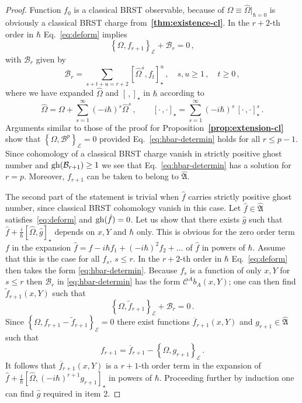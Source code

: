 \documentclass[a4paper,11pt]{amsart}
\numberwithin{thm}{section} %
\numberwithin{equation}{section} %
\numberwithin{figure}{section} %
\newcommand{\bref}[1]{{\bf \ref{#1}}}
\def\ih{-i\hbar}
\newcommand{\qcommut}[2]{[#1,#2]_\star}
\newcommand{\pb}[2]{\left\{{}#1{},{}#2{}\right\}}
\newcommand{\gh}[1]{{\rm gh}(#1)}
\renewcommand{\:}{{\rm\, :\,}}
\def\bar{\overline}
\def\cc{{\mathcal C}}
\def\cB{{\mathcal B}}
\def\qA{{\hat{\mathfrak A}}}
\def\E{{ \mathcal E}}
\begin{document}
\begin{proof}
Function $f_0$ is a classical BRST observable, because of
$\Omega\equiv{\hat\Omega}\bigr|_{\hbar=0}$ is obviously a classical
BRST charge from~\bref{thm:existence-cl}.  In the $r+2$-th order in
$\hbar$ Eq.~\eqref{eq:deform} implies
\begin{equation}
\label{eq:hbar-determin}
  \pb{\Omega}{f_{r+1}}_\E+\cB_r=0\,,
\end{equation}
with $\cB_r$ given by
\begin{equation}
\cB_r=\sum_{s+t+u=r+2} \qcommut{{\hat\Omega}^s}{f_t}^u\,, \quad s,u\geq
1\,, \quad t\geq 0\,,
\end{equation}
where we have expanded ${\hat\Omega}$ and $\qcommut{\,}{}$ in $\hbar$
according to
\begin{equation}
{\hat\Omega}=\Omega+\sum^\infty_{s=1}(\ih)^s {\hat\Omega}^s\,,\qquad
\qcommut{\cdot\,}{\cdot}=\sum^\infty_{s=1}(\ih)^s \,
\qcommut{\cdot\,}{\cdot}^s\,.
\end{equation}
Arguments similar to those of the proof for
Proposition~\bref{prop:extension-cl} show that
$\pb{\Omega}{\cB^p}_\E=0$ provided Eq.~\eqref{eq:hbar-determin} holds
for all $r\leq p-1$. Since cohomology of a classical BRST charge
vanish in strictly positive ghost number and $\gh{\cB_{r+1}}\geq 1$ we
see that Eq.~\eqref{eq:hbar-determin} has a solution for $r=p$.
Moreover, $f_{r+1}$ can be taken to belong to $\qA$.


The second part of the statement is trivial
when $\hat f$ carries strictly positive ghost number,
since classical BRST cohomology vanish in this case.
Let ${\hat f}\in\qA$ satisfies~\eqref{eq:deform}
and  $\gh{\hat f}=0$. Let us show that there exists $\hat g$
such that ${\hat f}+\frac{i}{\hbar}\qcommut{\hat\Omega}{\hat g}$
depends on $x,Y$ and $\hbar$ only. This is obvious for the zero order
term $f$ in the expansion ${\hat f}=f\ih f_1+(\ih)^2 f_2+\ldots$
of $\hat f$ in powers of $\hbar$.  Assume that this is the case
for all $f_s,\,s\leq r$. In the $r+2$-th order in $\hbar$
Eq.~\eqref{eq:deform}
then takes the form \eqref{eq:hbar-determin}. Because $f_s$ is a function
of only $x,Y$ for $s\leq r$ then $\cB_r$ in \eqref{eq:hbar-determin}
has the form $\cc^A b_A(x,Y)$; one can then find
${\tilde  f}_{r+1}(x,Y)$ such that
\begin{equation}
  \pb{\Omega}{{\tilde f}_{r+1}}_\E+\cB_r=0\,.
\end{equation}
Since $\pb{\Omega}{f_{r+1}-{\tilde f}_{r+1}}_\E=0$
there exist functions ${\bar f}_{r+1}(x,Y)$ and $g_{r+1}\in\qA$ such that
\begin{equation}
  f_{r+1}={\bar f}_{r+1}-\pb{\Omega}{g_{r+1}}_\E\,.
\end{equation}
It follows that ${\bar f}_{r+1}(x,Y)$
is a $r+1$-th order term in the expansion of
${\hat f}+\frac{i}{\hbar}\qcommut{\hat\Omega}{(\ih)^{r+1}g_{r+1}}$
in powers of $\hbar$. Proceeding further
by induction one can find $\hat g$ required in item 2.
\end{proof}
\end{document}
